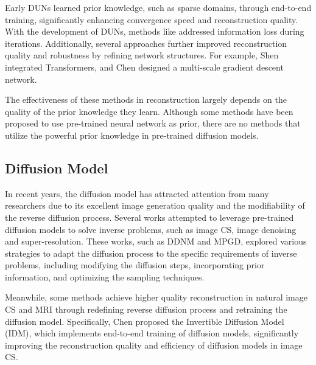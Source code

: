 \documentclass[10pt,twocolumn,letterpaper]{article}
\begin{document}
Early DUNs\cite{DBLP:conf/icml/GregorL10, yang2018admm, zhang2018ista, zhang2020amp} learned prior knowledge, such as sparse domains, through end-to-end training, significantly enhancing convergence speed and reconstruction quality. With the development of DUNs, methods like \cite{song2021memory, Song2023OptimizationInspiredCT} addressed information loss during iterations. Additionally, several approaches\cite{you2021coast, shen2022transcs, DBLP:journals/ijcv/ChenSXZ23, guoCPPNet2024, wangUFCNet2024, DBLP:journals/tmm/CuiFZZ24, DBLP:journals/tmm/KongCH24} further improved reconstruction quality and robustness by refining network structures. For example, Shen \etal\cite{shen2022transcs} integrated Transformers, and Chen \etal\cite{DBLP:journals/ijcv/ChenSXZ23} designed a multi-scale gradient descent network.

The effectiveness of these methods in reconstruction largely depends on the quality of the prior knowledge they learn. Although some methods\cite{Yuan20PnPSCI, Zhou_2023_ICCV, Zheng:21} have been proposed to use pre-trained neural network as prior, there are no methods that utilize the powerful prior knowledge in pre-trained diffusion models.  
\subsection{Diffusion Model}
In recent years, the diffusion model\cite{DBLP:conf/nips/HoJA20, DBLP:conf/iclr/SongME21} has attracted attention from many researchers due to its excellent image generation quality and the modifiability of the reverse diffusion process. Several works\cite{DBLP:conf/nips/KawarEES22, wang2022zero, DBLP:conf/nips/ChungSRY22, he2024manifold, DBLP:conf/iclr/SongVMK23, DBLP:conf/iclr/ChungKMKY23, DBLP:conf/cvpr/FeiLPZYLZ023, DBLP:conf/nips/RoutRDCDS23, DBLP:journals/pami/SahariaHCSFN23} attempted to leverage pre-trained diffusion models to solve inverse problems, such as image CS, image denoising and super-resolution. These works, such as DDNM\cite{wang2022zero} and MPGD\cite{he2024manifold}, explored various strategies to adapt the diffusion process to the specific requirements of inverse problems, including modifying the diffusion steps, incorporating prior information, and optimizing the sampling techniques.

Meanwhile, some methods\cite{DBLP:journals/corr/abs-2403-17006, DBLP:journals/mia/ChungY22, DBLP:journals/tmi/CaoCWLCZLZ24, DBLP:conf/siu/MirzaC23} achieve higher quality reconstruction in natural image CS and MRI through redefining reverse diffusion process and retraining the diffusion model. Specifically, Chen \etal\cite{DBLP:journals/corr/abs-2403-17006} proposed the Invertible Diffusion Model (IDM), which implements end-to-end training of diffusion models, significantly improving the reconstruction quality and efficiency of diffusion models in image CS.
\end{document}
